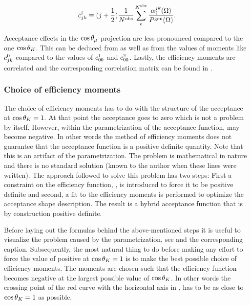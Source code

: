 \begin{equation}
\centering
 c^i_{jk} \equiv (j + \frac{1}{2})  \frac{1}{\Nobs} \sum_e^{\Nobs} \frac{\effbase}{\Pgen}.
  \label{eff_moms_calc_final}
\end{equation}

\noindent Acceptance effects in the $\cos\theta_{\mu}$ projection are less pronounced compared to the one $\cos\theta_{K}$.
This can be deduced from  as well as from the values of moments like $c^{0}_{jk}$
compared to the values of $c^{1}_{00}$ and $c^{2}_{00}$. Lastly, the efficiency moments are
correlated and the corresponding correlation matrix can be found in .

\subsubsection{Choice of efficiency moments}
The choice of efficiency moments has to do with the structure of the acceptance at $\cos\theta_{K}=1$. At that point the acceptance goes to zero
which is not a problem by itself. However, within the parametrization of the acceptance function,  may become negative.
In other words the method of efficiency moments does not guarantee that the acceptance function is a positive definite quantity.
Note that this is an artifact of the parametrization. The problem is mathematical in nature and there is no standard solution (known
to the author when these lines were written). The approach followed to solve this problem has two steps: First a constraint on the
efficiency function, , is introduced to force it to be positive definite and second, a fit to the efficiency
moments is performed to optimize the acceptance shape description. The result is a hybrid acceptance function that is by
construction positive definite.

Before laying out the formulas behind the above-mentioned steps it is useful to visualize the problem caused by the parametrization, see 
and the corresponding caption. Subsequently, the most natural thing to do before making any effort to force the value of 
positive at $\cos\theta_{K}=1$ is to make the best possible choice of efficiency moments. The moments are chosen such that the efficiency function becomes negative
at the largest possible value of $\cos\theta_{K}$. In other words the crossing point of the red curve with the horizontal axis in ,
has to be as close to $\cos\theta_{K}=1$ as possible.

